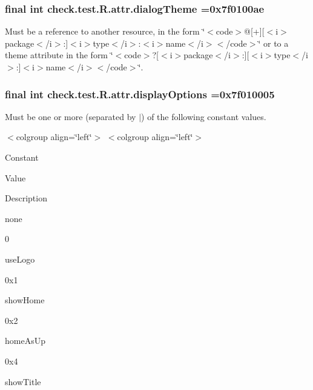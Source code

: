 \subsubsection[{dialog\+Theme}]{\setlength{\rightskip}{0pt plus 5cm}final int check.\+test.\+R.\+attr.\+dialog\+Theme =0x7f0100ae\hspace{0.3cm}{\ttfamily [static]}}\label{classcheck_1_1test_1_1_r_1_1attr_a3ea5dd752e953db06c68789665c1627c}
Must be a reference to another resource, in the form \char`\"{}$<$code$>$@\mbox{[}+\mbox{]}\mbox{[}$<$i$>$package$<$/i$>$\+:\mbox{]}$<$i$>$type$<$/i$>$\+:$<$i$>$name$<$/i$>$$<$/code$>$\char`\"{} or to a theme attribute in the form \char`\"{}$<$code$>$?\mbox{[}$<$i$>$package$<$/i$>$\+:\mbox{]}\mbox{[}$<$i$>$type$<$/i$>$\+:\mbox{]}$<$i$>$name$<$/i$>$$<$/code$>$\char`\"{}. \hypertarget{classcheck_1_1test_1_1_r_1_1attr_ab08eeb4f7b4fc4c6f2ef651396d41d99}{}
\subsubsection[{display\+Options}]{\setlength{\rightskip}{0pt plus 5cm}final int check.\+test.\+R.\+attr.\+display\+Options =0x7f010005\hspace{0.3cm}{\ttfamily [static]}}\label{classcheck_1_1test_1_1_r_1_1attr_ab08eeb4f7b4fc4c6f2ef651396d41d99}
Must be one or more (separated by \textquotesingle{}$\vert$\textquotesingle{}) of the following constant values.

\begin{TabularC}{0}
\hline
\end{TabularC}
$<$colgroup align=\char`\"{}left\char`\"{}$>$ $<$colgroup align=\char`\"{}left\char`\"{}$>$ 

Constant

Value

Description 

{\ttfamily none}

0

{\ttfamily use\+Logo}

0x1

{\ttfamily show\+Home}

0x2

{\ttfamily home\+As\+Up}

0x4

{\ttfamily show\+Title}

